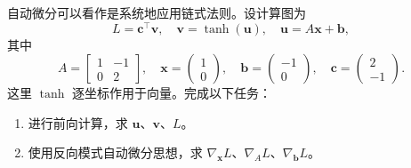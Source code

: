 自动微分可以看作是系统地应用链式法则。设计算图为
\[
L = \bm{c}^\top \bm{v},\quad
\bm{v} = \tanh(\bm{u}),\quad
\bm{u} = A \bm{x} + \bm{b},
\]
其中
\[
A = \begin{bmatrix}
    1 & -1 \\
    0 & 2
\end{bmatrix},\quad
\bm{x} = \begin{pmatrix} 1 \\ 0 \end{pmatrix},\quad
\bm{b} = \begin{pmatrix} -1 \\ 0 \end{pmatrix},\quad
\bm{c} = \begin{pmatrix} 2 \\ -1 \end{pmatrix}.
\]
这里 $\tanh$ 逐坐标作用于向量。完成以下任务：
\begin{enumerate}
    \item 进行前向计算，求 $\bm{u}$、$\bm{v}$、$L$。
    \item 使用反向模式自动微分思想，求 $\nabla_{\bm{x}} L$、$\nabla_{A} L$、$\nabla_{\bm{b}} L$。
\end{enumerate}

